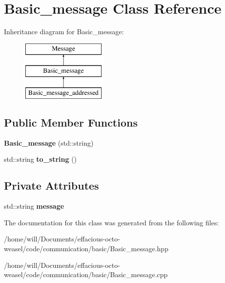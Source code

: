 \hypertarget{class_basic__message}{}\section{Basic\+\_\+message Class Reference}
\label{class_basic__message}
Inheritance diagram for Basic\+\_\+message\+:\begin{figure}[H]
\begin{center}
\leavevmode
\includegraphics[height=3.000000cm]{class_basic__message}
\end{center}
\end{figure}
\subsection*{Public Member Functions}
\begin{DoxyCompactItemize}
\item 
{\bfseries Basic\+\_\+message} (std\+::string)\hypertarget{class_basic__message_a4fcd1befdfc1b20b042506821fd04177}{}\label{class_basic__message_a4fcd1befdfc1b20b042506821fd04177}

\item 
std\+::string {\bfseries to\+\_\+string} ()\hypertarget{class_basic__message_afe08455d205cb5c449dc756edef987cf}{}\label{class_basic__message_afe08455d205cb5c449dc756edef987cf}

\end{DoxyCompactItemize}
\subsection*{Private Attributes}
\begin{DoxyCompactItemize}
\item 
std\+::string {\bfseries message}\hypertarget{class_basic__message_a2b5245bca6f105c211b1b0f404b64c1c}{}\label{class_basic__message_a2b5245bca6f105c211b1b0f404b64c1c}

\end{DoxyCompactItemize}


The documentation for this class was generated from the following files\+:\begin{DoxyCompactItemize}
\item 
/home/will/\+Documents/effacious-\/octo-\/weasel/code/communication/basic/Basic\+\_\+message.\+hpp\item 
/home/will/\+Documents/effacious-\/octo-\/weasel/code/communication/basic/Basic\+\_\+message.\+cpp\end{DoxyCompactItemize}
